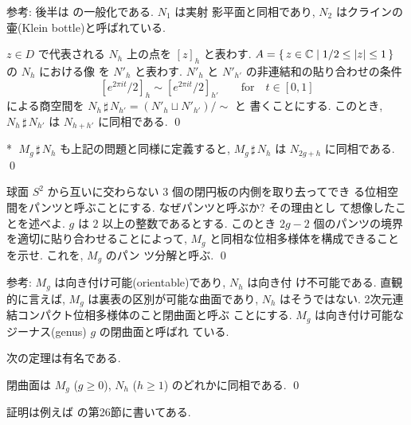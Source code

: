 \documentclass[12pt,twoside]{jarticle}
\def\qstar#1{$\!\!\!$#1$\;$}
\def\C{{\Bbb C}} %
\begin{document}
\noindent 参考: 後半は  の一般化である. $N_1$ は実射
影平面と同相であり, $N_2$ はクラインの壷(Klein bottle)と呼ばれている.

\begin{question}
  $z \in D$ で代表される $N_h$ 上の点を $[z]_h$ と表わす. 
  $A = \{\, z \in \C \mid 1/2 \le |z| \le 1 \,\}$ の $N_h$ における像%
  を $N'_h$ と表わす. 
  $N'_h$ と $N'_{h'}$ の非連結和の貼り合わせの条件
  \[
    [e^{2\pi i t}/2]_h \sim [e^{2\pi i t}/2]_{h'}
    \qquad\text{for}\quad
    t \in [0,1]
  \]%
  による商空間を $N_h\,\sharp\,N_{h'} = (N'_h\sqcup N'_{h'})/{\sim}$ と
  書くことにする. %
  このとき, $N_h\,\sharp\,N_{h'}$ は $N_{h+h'}$ に同相である. \qed
\end{question}

\begin{question}\qstar{*}
  $M_g\,\sharp\,N_h$ も上記の問題と同様に定義すると, %
  $M_g\,\sharp\,N_h$ は $N_{2g+h}$ に同相である. \qed
\end{question}

\begin{question}[パンツ分解]
  球面 $S^2$ から互いに交わらない $3$ 個の閉円板の内側を取り去ってでき
  る位相空間をパンツと呼ぶことにする. なぜパンツと呼ぶか? その理由とし
  て想像したことを述べよ. $g$ は $2$ 以上の整数であるとする. %
  このとき $2g-2$ 個のパンツの境界を適切に貼り合わせることによって, %
  $M_g$ と同相な位相多様体を構成できることを示せ. これを, $M_g$ のパン
  ツ分解と呼ぶ. \qed
\end{question}

\medskip

\noindent 参考: $M_g$ は向き付け可能(orientable)であり, $N_h$ は向き付
け不可能である. 直観的に言えば, $M_g$ は裏表の区別が可能な曲面であり, %
$N_h$ はそうではない. 2次元連結コンパクト位相多様体のこと閉曲面と呼ぶ
ことにする. $M_g$ は向き付け可能なジーナス(genus) $g$ の閉曲面と呼ばれ
ている.

次の定理は有名である.

\begin{Theorem}[閉曲面の分類]
  閉曲面は $M_g$ ($g\ge0$), $N_h$ ($h\ge1$) のどれかに同相である. \qed
\end{Theorem}

\noindent 証明は例えば \cite{Tamura}{} の第26節に書いてある.
\end{document}
